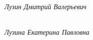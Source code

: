\begin{figure}[H]
\begin{minipage}[h]{0.47\linewidth}
		\emph{Лузин Дмитрий Валерьевич}
	\end{minipage}
	\hfill
	\begin{minipage}[h]{0.47\linewidth}
		\\
		\emph{Лузина Екатерина Павловна}
	\end{minipage}
\end{figure}

\newpage
